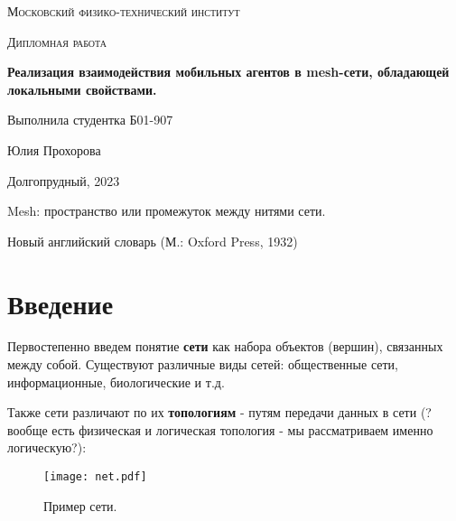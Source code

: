 \documentclass[a4paper]{article}
\begin{document}
\newcommand{\apple}{\char"F8FF}



\begin{titlepage}
    \vspace*{4cm}
	\centering
    {\scshape\LARGE Московский физико-технический институт\par}
	\vspace{1cm}
	{\scshape\Large Дипломная работа\par}
	\vspace{1cm}
    {\huge\bfseries Реализация взаимодействия мобильных агентов в mesh-сети,  обладающей  локальными свойствами. \par}
	\vspace{2cm}
	\vfill
\begin{flushright}
	{\large Выполнила студентка Б01-907}\par
	\vspace{0.3cm}
	{\LARGE Юлия Прохорова}
\end{flushright}
	
	\vfill
Долгопрудный, 2023
\end{titlepage}

\pagestyle{fancy} 
\fancyhead[C]{}
\fancyfoot[C]{ \noindent\rule{\textwidth}{0.4pt} \thepage }

\tableofcontents

\newpage

\epigraph{Mesh: пространство или промежуток между нитями сети.}{Новый английский словарь (М.: Oxford Press, 1932)}

\section{Введение}
Первостепенно введем понятие \textbf{сети} как набора объектов (вершин), связанных между собой. Существуют различные виды сетей: общественные сети, информационные, биологические и т.д. \par
Также сети различают по их \textbf{топологиям} - путям передачи данных в сети (?вообще есть физическая и логическая топология - мы рассматриваем именно логическую?):

\begin{figure}[H]
	\begin{center}
	\texttt{[image: net.pdf]}
	\caption{Пример сети.} 
    \label{p1}
    \end {center}
\end{figure}
\end{document}
